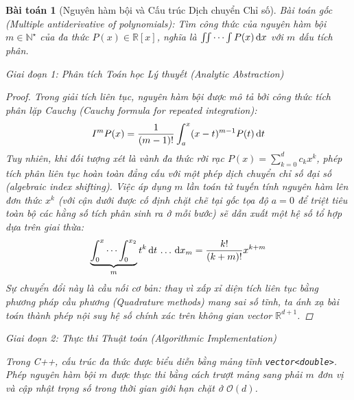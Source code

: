\documentclass{article}
\newtheorem{baitoan}{Bài toán}
\begin{document}


\begin{baitoan}[Nguyên hàm bội và Cấu trúc Dịch chuyển Chỉ số]
 \emph{Bài toán gốc (Multiple antiderivative of polynomials):} 
 Tìm công thức của nguyên hàm bội $m\in\mathbb{N}^\star$ của đa thức $P(x)\in\mathbb{R}[x]$, nghĩa là $\iint\cdots\int P(x)\,{\rm d}x$ với $m$ dấu tích phân.

\vspace{0.5em}\noindent\emph{Giai đoạn 1: Phân tích Toán học Lý thuyết (Analytic Abstraction)}
 
 \begin{proof}
 Trong giải tích liên tục, nguyên hàm bội được mô tả bởi công thức tích phân lặp Cauchy (Cauchy formula for repeated integration):
 \begin{equation}
 I^m P(x) = \frac{1}{(m-1)!} \int_a^x (x-t)^{m-1} P(t) \, {\rm d}t
 \end{equation}
 Tuy nhiên, khi đối tượng xét là vành đa thức rời rạc $P(x) = \sum_{k=0}^d c_k x^k$, phép tích phân liên tục hoàn toàn đẳng cấu với một phép dịch chuyển chỉ số đại số (algebraic index shifting). Việc áp dụng $m$ lần toán tử tuyến tính nguyên hàm lên đơn thức $x^k$ (với cận dưới được cố định chặt chẽ tại gốc tọa độ $a=0$ để triệt tiêu toàn bộ các hằng số tích phân sinh ra ở mỗi bước) sẽ dẫn xuất một hệ số tổ hợp dựa trên giai thừa:
 \begin{equation}
 \underbrace{\int_0^x \cdots \int_0^{x_2}}_{m} t^k \, {\rm d}t \, \dots \, {\rm d}x_m = \frac{k!}{(k+m)!} x^{k+m}
 \end{equation}
 Sự chuyển đổi này là cầu nối cơ bản: thay vì xấp xỉ diện tích liên tục bằng phương pháp cầu phương (Quadrature methods) mang sai số tĩnh, ta ánh xạ bài toán thành phép nội suy hệ số chính xác trên không gian vector $\mathbb{R}^{d+1}$.
 \end{proof}

\vspace{0.5em}\noindent\emph{Giai đoạn 2: Thực thi Thuật toán (Algorithmic Implementation)}
 
 Trong C++, cấu trúc đa thức được biểu diễn bằng mảng tĩnh \texttt{vector<double>}. Phép nguyên hàm bội $m$ được thực thi bằng cách trượt mảng sang phải $m$ đơn vị và cập nhật trọng số trong thời gian giới hạn chặt ở $\mathcal{O}(d)$.




\end{baitoan}
\end{document}
